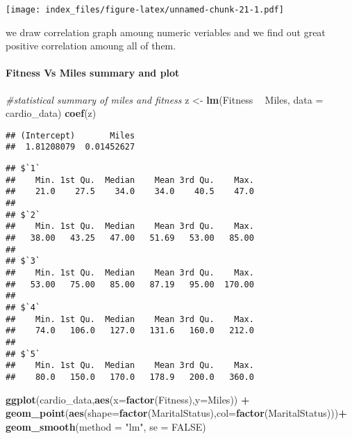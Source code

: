 \documentclass[
]{article}
\newenvironment{Shaded}{\begin{snugshade}}{\end{snugshade}}
\newcommand{\CommentTok}[1]{\textcolor[rgb]{0.56,0.35,0.01}{\textit{#1}}}
\newcommand{\DataTypeTok}[1]{\textcolor[rgb]{0.13,0.29,0.53}{#1}}
\newcommand{\KeywordTok}[1]{\textcolor[rgb]{0.13,0.29,0.53}{\textbf{#1}}}
\newcommand{\NormalTok}[1]{#1}
\newcommand{\OperatorTok}[1]{\textcolor[rgb]{0.81,0.36,0.00}{\textbf{#1}}}
\newcommand{\OtherTok}[1]{\textcolor[rgb]{0.56,0.35,0.01}{#1}}
\newcommand{\StringTok}[1]{\textcolor[rgb]{0.31,0.60,0.02}{#1}}
\begin{document}
\texttt{[image: index\_files/figure-latex/unnamed-chunk-21-1.pdf]}

we draw correlation graph amoung numeric veriables and we find out great
positive correlation amoung all of them.

\hypertarget{fitness-vs-miles-summary-and-plot}{%
\paragraph{Fitness Vs Miles summary and
plot}\label{fitness-vs-miles-summary-and-plot}}

\begin{Shaded}
\begin{Highlighting}[]
\CommentTok{#statistical summary of miles and fitness}
\NormalTok{z <-}\StringTok{ }\KeywordTok{lm}\NormalTok{(Fitness }\OperatorTok{~}\StringTok{ }\NormalTok{Miles, }\DataTypeTok{data =}\NormalTok{ cardio_data)}
\KeywordTok{coef}\NormalTok{(z)}
\end{Highlighting}
\end{Shaded}

\begin{verbatim}
## (Intercept)       Miles 
##  1.81208079  0.01452627
\end{verbatim}

\begin{Shaded}
\end{Shaded}

\begin{verbatim}
## $`1`
##    Min. 1st Qu.  Median    Mean 3rd Qu.    Max. 
##    21.0    27.5    34.0    34.0    40.5    47.0 
## 
## $`2`
##    Min. 1st Qu.  Median    Mean 3rd Qu.    Max. 
##   38.00   43.25   47.00   51.69   53.00   85.00 
## 
## $`3`
##    Min. 1st Qu.  Median    Mean 3rd Qu.    Max. 
##   53.00   75.00   85.00   87.19   95.00  170.00 
## 
## $`4`
##    Min. 1st Qu.  Median    Mean 3rd Qu.    Max. 
##    74.0   106.0   127.0   131.6   160.0   212.0 
## 
## $`5`
##    Min. 1st Qu.  Median    Mean 3rd Qu.    Max. 
##    80.0   150.0   170.0   178.9   200.0   360.0
\end{verbatim}

\begin{Shaded}
\begin{Highlighting}[]
\KeywordTok{ggplot}\NormalTok{(cardio_data,}\KeywordTok{aes}\NormalTok{(}\DataTypeTok{x=}\KeywordTok{factor}\NormalTok{(Fitness),}\DataTypeTok{y=}\NormalTok{Miles)) }\OperatorTok{+}
\StringTok{  }\KeywordTok{geom_point}\NormalTok{(}\KeywordTok{aes}\NormalTok{(}\DataTypeTok{shape=}\KeywordTok{factor}\NormalTok{(MaritalStatus),}\DataTypeTok{col=}\KeywordTok{factor}\NormalTok{(MaritalStatus)))}\OperatorTok{+}
\StringTok{  }\KeywordTok{geom_smooth}\NormalTok{(}\DataTypeTok{method =} \StringTok{"lm"}\NormalTok{, }\DataTypeTok{se =} \OtherTok{FALSE}\NormalTok{)}
\end{Highlighting}
\end{Shaded}
\end{document}
